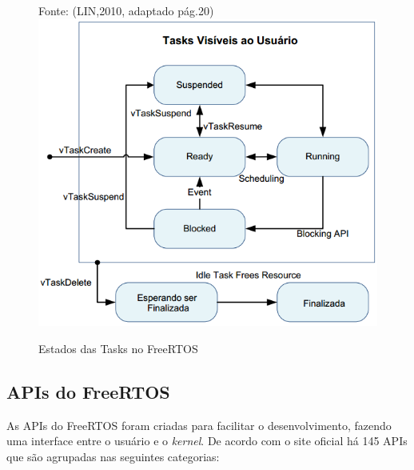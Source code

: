 \begin{figure}[h]
\footnotesize{	
	\centering
	
	Fonte: (LIN,2010, adaptado pág.20)
	\includegraphics[keepaspectratio=true,scale=0.8]{figuras/freertosTasks.PNG}
	\caption{Estados das Tasks no FreeRTOS}
	
	\label{fig23}
}
\end{figure}
\FloatBarrier
\subsection{APIs do FreeRTOS}

As APIs do FreeRTOS foram criadas para facilitar o desenvolvimento, fazendo uma interface entre o usuário e o \textit{kernel}. De acordo com o site oficial há 145 APIs que são agrupadas nas seguintes categorias:

